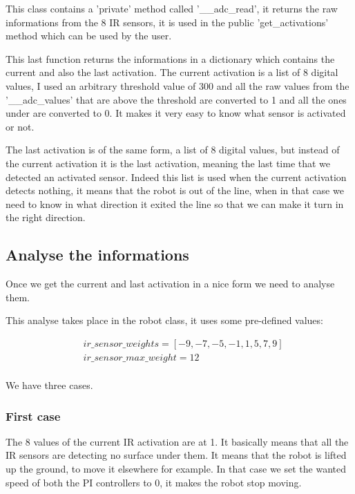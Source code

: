This class contains a 'private' method called '\_\_adc\_read', it returns the raw informations from the 8 IR sensors, it is used in the public 'get\_activations' method which can be used by the user.

This last function returns the informations in a dictionary which contains the current and also the last activation.
The current activation is a list of 8 digital values, I used an arbitrary threshold value of 300 and all the raw values from the '\_\_adc\_values' that are above the threshold are converted to 1 and all the ones under are converted to 0.
It makes it very easy to know what sensor is activated or not.

The last activation is of the same form, a list of 8 digital values, but instead of the current activation it is the last activation, meaning the last time that we detected an activated sensor.
Indeed this list is used when the current activation detects nothing, it means that the robot is out of the line, when in that case we need to know in what direction it exited the line so that we can make it turn in the right direction.

\subsection*{Analyse the informations}

Once we get the current and last activation in a nice form we need to analyse them.

This analyse takes place in the robot class, it uses some pre-defined values:

\begin{align*}
    &ir\_sensor\_weights = [-9, -7, -5, -1, 1, 5, 7, 9]\\
    &ir\_sensor\_max\_weight = 12\\
\end{align*}

We have three cases.

\subsubsection*{First case}

The 8 values of the current IR activation are at 1.
It basically means that all the IR sensors are detecting no surface under them.
It means that the robot is lifted up the ground, to move it elsewhere for example.
In that case we set the wanted speed of both the PI controllers to 0, it makes the robot stop moving.

